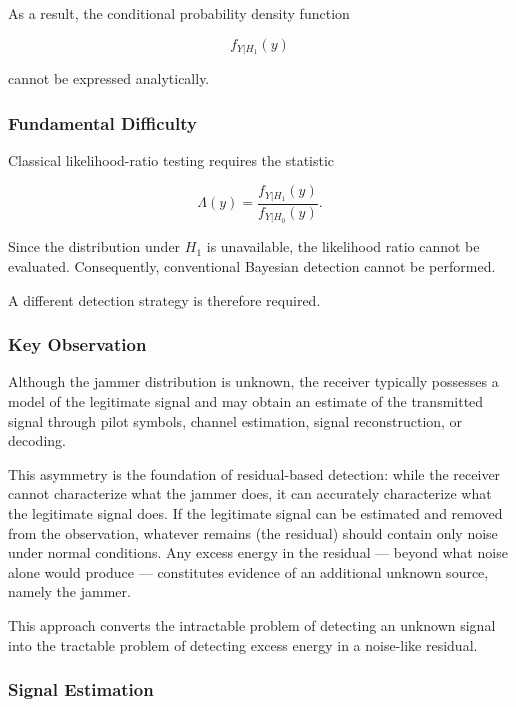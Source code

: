 \documentclass{article}
\begin{document}
As a result, the conditional probability density function

\begin{equation}
f_{Y|H_1}(y)
\end{equation}

cannot be expressed analytically.

\subsubsection{Fundamental Difficulty}

Classical likelihood-ratio testing requires the statistic

\begin{equation}
\Lambda(y)
=
\frac{f_{Y|H_1}(y)}
     {f_{Y|H_0}(y)}.
\end{equation}

Since the distribution under $H_1$ is unavailable, the likelihood ratio cannot be evaluated. Consequently, conventional Bayesian detection cannot be performed.

A different detection strategy is therefore required.

\subsubsection{Key Observation}

Although the jammer distribution is unknown, the receiver typically possesses a model of the legitimate signal and may obtain an estimate of the transmitted signal through pilot symbols, channel estimation, signal reconstruction, or decoding.

This asymmetry is the foundation of residual-based detection: while the receiver cannot characterize what the jammer does, it can accurately characterize what the legitimate signal does. If the legitimate signal can be estimated and removed from the observation, whatever remains (the residual) should contain only noise under normal conditions. Any excess energy in the residual — beyond what noise alone would produce — constitutes evidence of an additional unknown source, namely the jammer.

This approach converts the intractable problem of detecting an unknown signal into the tractable problem of detecting excess energy in a noise-like residual.

\subsubsection{Signal Estimation}
\end{document}
